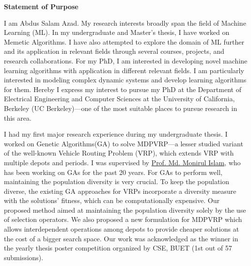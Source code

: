 \documentclass[12pt]{article}
\begin{document}


\fancyhf{}
\rfoot{\thepage}

\begin{center}
{\LARGE \bf 
Statement of Purpose}\\
\end{center}



I am Abdus Salam Azad. My research interests broadly span the field of Machine Learning (ML). In my undergraduate and Master's thesis, I have worked on Memetic Algorithms. I have also attempted to explore the domain of ML further and its application in relevant fields through several courses, projects, and research collaborations. For my PhD, I am interested in developing novel machine learning algorithms with application in different relevant fields. I am particularly interested in modeling complex dynamic systems and develop learning algorithms for them. Hereby I express my interest to pursue my PhD at the Department of Electrical Engineering and Computer Sciences at the University of California, Berkeley (UC Berkeley)---one of the most suitable places to pursue research in this area.

I had my first major research experience during my undergraduate thesis. I worked on Genetic Algorithms(GA) to solve MDPVRP---a lesser studied variant of the well-known Vehicle Routing Problem (VRP), which extends VRP with multiple depots and periods. I was supervised by \href{http://cse.buet.ac.bd/faculty/facdetail.php?id=mdmonirulislam}{Prof. Md. Monirul Islam}, who has been working on GAs for the past 20 years. For GAs to perform well, maintaining the population diversity is very crucial. To keep the population diverse, the existing GA approaches for VRPs incorporate a diversity measure with the solutions' fitness, which can be computationally expensive. Our proposed method aimed at maintaining the population diversity solely by the use of selection operators. We also proposed a new formulation for MDPVRP which allows interdependent operations among depots to provide cheaper solutions at the cost of a bigger search space. Our work was acknowledged as the winner in the yearly thesis poster competition organized by CSE, BUET (1st out of 57 submissions).
\end{document}
